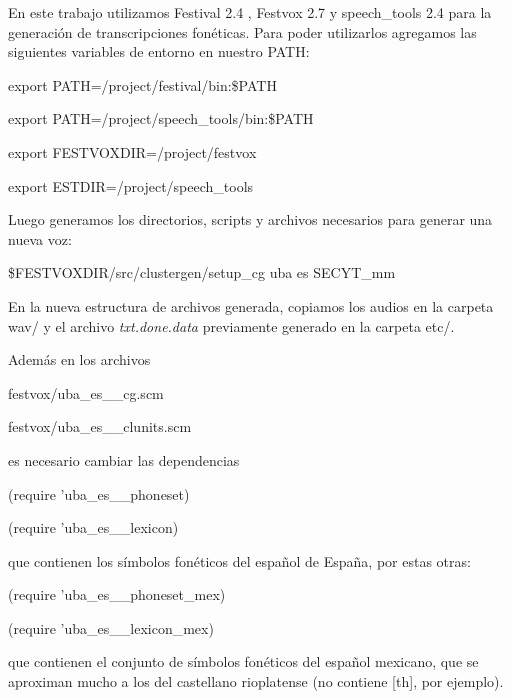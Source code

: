 En este trabajo utilizamos Festival 2.4 \cite{festivalDownload}, Festvox 2.7 \cite{festvoxDownload} y speech\_tools 2.4 \cite{speechToolDownload} para la generación de transcripciones fonéticas. Para poder utilizarlos agregamos las siguientes variables de entorno en nuestro PATH:

\begin{tcolorbox}
export PATH=/project/festival/bin:\$PATH

export PATH=/project/speech\_tools/bin:\$PATH

export FESTVOXDIR=/project/festvox

export ESTDIR=/project/speech\_tools
\end{tcolorbox}

Luego generamos los directorios, scripts y archivos necesarios para generar una nueva voz:
\begin{tcolorbox}
\$FESTVOXDIR/src/clustergen/setup\_cg uba es SECYT\_mm
\end{tcolorbox}

En la nueva estructura de archivos generada, copiamos los audios en la carpeta wav/ y el archivo \textit{txt.done.data} previamente generado en la carpeta etc/.

Además en los archivos 

\begin{tcolorbox}
festvox/uba\_es\_\_cg.scm 

festvox/uba\_es\_\_clunits.scm
\end{tcolorbox}

\noindent es necesario cambiar las dependencias 

\begin{tcolorbox}
(require 'uba\_es\_\_phoneset)

(require 'uba\_es\_\_lexicon)
\end{tcolorbox}

\noindent que contienen los símbolos fonéticos del español de España, por estas otras:

\begin{tcolorbox}
(require 'uba\_es\_\_phoneset\_mex)

(require 'uba\_es\_\_lexicon\_mex)
\end{tcolorbox}

\noindent que contienen el conjunto de símbolos fonéticos del español mexicano, que se aproximan mucho a los del castellano rioplatense (no contiene [th], por ejemplo).

